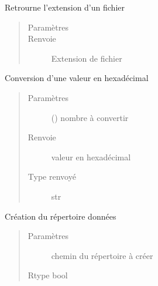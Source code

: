 \documentclass[letterpaper,10pt,french]{sphinxmanual}
\begin{document}
\begin{fulllineitems}
\label{\detokenize{modules/tools:toolbox.tools.file_ext}}
Retrourne l’extension d’un fichier
\begin{quote}\begin{description}
\item[{Paramètres}] \leavevmode
{} \textendash{} 

\item[{Renvoie}] \leavevmode
Extension de fichier

\end{description}\end{quote}

\end{fulllineitems}


\begin{fulllineitems}
\label{\detokenize{modules/tools:toolbox.tools.inttohex}}
Conversion d’une valeur en hexadécimal
\begin{quote}\begin{description}
\item[{Paramètres}] \leavevmode
{} () \textendash{} nombre à convertir

\item[{Renvoie}] \leavevmode
valeur en hexadécimal

\item[{Type renvoyé}] \leavevmode
str

\end{description}\end{quote}

\end{fulllineitems}


\begin{fulllineitems}
\label{\detokenize{modules/tools:toolbox.tools.makedirs}}
Création du répertoire données
\begin{quote}\begin{description}
\item[{Paramètres}] \leavevmode
{} \textendash{} chemin du répertoire à créer

\item[{Rtype bool}] \leavevmode
\end{description}\end{quote}

\end{fulllineitems}
\end{document}
